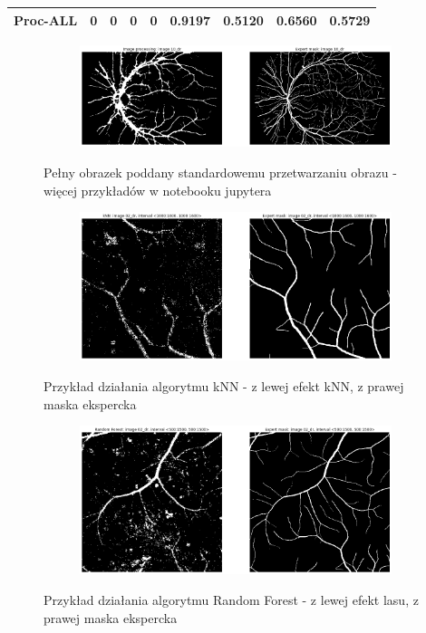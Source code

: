 \documentclass[12pt]{article}
\begin{document}
\begin{landscape}
\begin{tabular}{| l | l | l | l | l | l | l | l | l |}
			\textbf{Proc-ALL} & 0 & 0 & 0 & 0 & 0.9197 & 0.5120 & 0.6560 & \textbf{0.5729}\\ \hline
		\end{tabular}
	\end{landscape}

\begin{figure}[h!]
	\centering
	\begin{subfigure}[b]{0.99\linewidth}
		\includegraphics[width=\linewidth]{Results/process.png}
	\end{subfigure}
	\caption{Pełny obrazek poddany standardowemu przetwarzaniu obrazu - więcej przykładów w notebooku jupytera}
\end{figure}
\begin{figure}[h!]
	\begin{subfigure}[b]{0.98\linewidth}
		\includegraphics[width=\linewidth]{Results/kNN.png}
	\end{subfigure}
	\caption{Przykład działania algorytmu kNN - z lewej efekt kNN, z prawej maska ekspercka}
\end{figure}
\begin{figure}[h!]
	\begin{subfigure}[b]{0.98\linewidth}
		\includegraphics[width=\linewidth]{Results/rfc.png}
	\end{subfigure}
	\caption{Przykład działania algorytmu Random Forest - z lewej efekt lasu, z prawej maska ekspercka}
\end{figure}
\newpage
\end{document}
